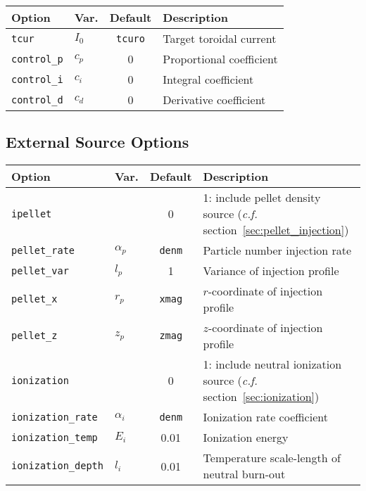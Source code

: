 \documentclass[letterpaper]{book}
\begin{document}
\begin{tabular}{llcl}
  \textbf{Option}&\textbf{Var.}&\textbf{Default}&\textbf{Description}\\
  \hline
  \texttt{tcur}       & $I_0$ & \texttt{tcuro} & Target toroidal current\\
  \texttt{control\_p} & $c_p$ & 0              & Proportional coefficient\\
  \texttt{control\_i} & $c_i$ & 0              & Integral coefficient\\
  \texttt{control\_d} & $c_d$ & 0              & Derivative coefficient\\
\end{tabular}


\subsection{External Source Options}

\begin{tabular}{llcp{2in}}
  \textbf{Option}&\textbf{Var.}&\textbf{Default}&\textbf{Description}\\
  \hline
  \texttt{ipellet}      & & 0    & 1: include pellet density
    source (\textit{c.f.} section~\ref{sec:pellet_injection})\\
  \texttt{pellet\_rate} & $\alpha_p$ & \texttt{denm} 
                                     & Particle number injection rate\\
  \texttt{pellet\_var}  & $l_p$      & 1    & Variance of  
                                              injection profile\\
  \texttt{pellet\_x}    & $r_p$      & \texttt{xmag} 
                                     & $r$-coordinate of injection profile\\
  \texttt{pellet\_z}    & $z_p$      & \texttt{zmag} 
                                     & $z$-coordinate of injection profile\\
  \texttt{ionization}   & & 0  & 1: include neutral ionization
    source (\textit{c.f.} section~\ref{sec:ionization})\\
  \texttt{ionization\_rate} & $\alpha_i$ & \texttt{denm} 
                                     & Ionization rate coefficient\\
  \texttt{ionization\_temp} & $E_i$   & 0.01 & Ionization energy\\
  \texttt{ionization\_depth}& $l_i$   & 0.01 & Temperature 
    scale-length of neutral burn-out
\end{tabular}
\end{document}
